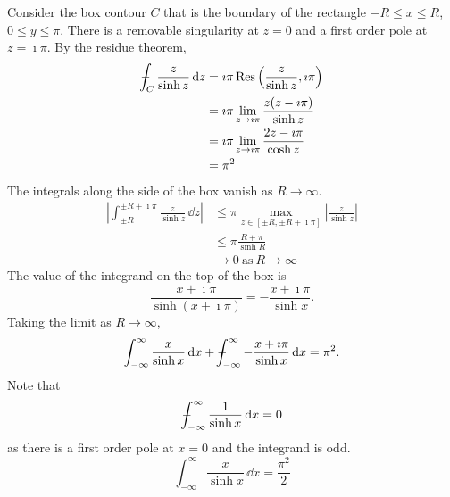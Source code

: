 {%
\begin{Solution}
  \label{solution x/sinh x}
  Consider the box contour $C$ that is the boundary of the rectangle
  $-R \leq x \leq R$, $0 \leq y \leq \pi$.   There is a removable singularity
  at $z = 0$ and a first order pole at $z = \imath \pi$.  By the residue theorem,
  \begin{align*}
    - \negthickspace \negthickspace \negthickspace \negmedspace\int_C \frac{z}{\sinh z} \,\mathrm{d} z
    &= \imath \pi \mathop{\mathrm{Res}}\nolimits \left( \frac{z}{\sinh z}, \imath \pi \right) \\
    &= \imath \pi \lim_{z \to \imath \pi} \frac{ z (z - \imath \pi) }{ \sinh z } \\
    &= \imath \pi \lim_{z \to \imath \pi} \frac{ 2 z - \imath \pi }{ \cosh z } \\
    &= \pi^2
  \end{align*}
  The integrals along the side of the box vanish as $R \to \infty$.
  \begin{align*}
    \left| \int_{\pm R}^{\pm R + \imath \pi} \frac{z}{\sinh z} \,\dd z \right|
    &\leq \pi \max_{z \in [\pm R, \pm R + \imath \pi]}
    \left| \frac{z}{\sinh z} \right| \\
    &\leq \pi \frac{R + \pi}{ \sinh R } \\
    &\to 0\ \mathrm{as}\ R \to \infty
  \end{align*}
  The value of the integrand on the top of the box is
  \[
  \frac{x + \imath \pi}{\sinh(x + \imath \pi)} = - \frac{x + \imath \pi}{ \sinh x }.
  \]
  Taking the limit as $R \to \infty$,
  \[
  \int_{-\infty}^\infty \frac{x}{\sinh x} \,\mathrm{d} x
  + - \negthickspace \negthickspace \negthickspace \negmedspace\int_{-\infty}^\infty - \frac{x + \imath \pi}{\sinh x} \,\mathrm{d} x
  = \pi^2.
  \]
  Note that 
  \[
  - \negthickspace \negthickspace \negthickspace \negmedspace\int_{-\infty}^\infty \frac{1}{\sinh x} \,\mathrm{d} x = 0
  \]
  as there is a first order pole at $x = 0$ and the integrand is odd.
  \[
  \boxed{
    \int_{-\infty}^\infty \frac{x}{\sinh x} \,\dd x = \frac{\pi^2}{2}
    }
  \]
\end{Solution}



}
